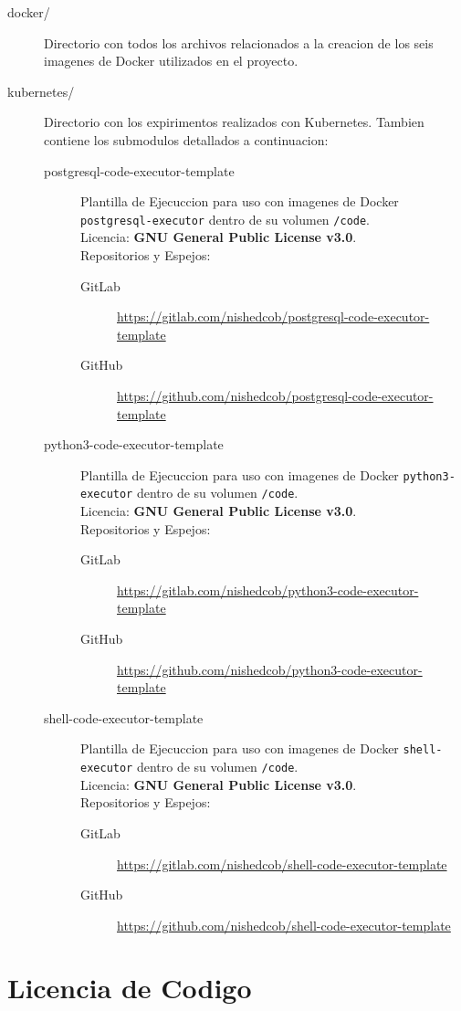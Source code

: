 \begin{description}
\begin{description}
        \item[docker/] Directorio con todos los archivos relacionados a la creacion de los seis imagenes de Docker utilizados en el proyecto.
        \item[kubernetes/] Directorio con los expirimentos realizados con Kubernetes. Tambien contiene los submodulos detallados a continuacion:
        \begin{description}
        	\item[postgresql-code-executor-template] Plantilla de Ejecuccion para uso con imagenes de Docker \texttt{postgresql-executor} dentro de su volumen \texttt{/code}.\\
            Licencia: \textbf{GNU General Public License v3.0}. \\
            Repositorios y Espejos:
            \begin{description}
            	\item[GitLab] \sloppy \url{https://gitlab.com/nishedcob/postgresql-code-executor-template}
                \item[GitHub] \sloppy \url{https://github.com/nishedcob/postgresql-code-executor-template}
            \end{description}
        	\item[python3-code-executor-template] Plantilla de Ejecuccion para uso con imagenes de Docker \texttt{python3-executor} dentro de su volumen \texttt{/code}.\\
            Licencia: \textbf{GNU General Public License v3.0}. \\
            Repositorios y Espejos:
            \begin{description}
            	\item[GitLab] \sloppy \url{https://gitlab.com/nishedcob/python3-code-executor-template}
                \item[GitHub] \sloppy \url{https://github.com/nishedcob/python3-code-executor-template}
            \end{description}
        	\item[shell-code-executor-template] Plantilla de Ejecuccion para uso con imagenes de Docker \texttt{shell-executor} dentro de su volumen \texttt{/code}.\\
            Licencia: \textbf{GNU General Public License v3.0}. \\
            Repositorios y Espejos:
            \begin{description}
            	\item[GitLab] \sloppy \url{https://gitlab.com/nishedcob/shell-code-executor-template}
                \item[GitHub] \sloppy \url{https://github.com/nishedcob/shell-code-executor-template}
            \end{description}
        \end{description}
    \end{description}
\end{description}

\section{Licencia de Codigo}
